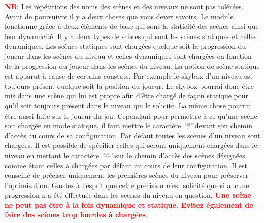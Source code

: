\documentclass[a4paper, 11pt]{article}
\begin{document}
	\textcolor{red}{\textbf{NB}:} Les répétitions des noms des scènes et des niveaux ne sont pas
	tolérées. Avant de poursuivre il y a deux choses que vous devez savoirs: Le module fonctionne grâce à 
	deux éléments de base qui sont la staticité des scènes ainsi que leur dynamicité. Il y a deux types de 
	scènes qui sont les scènes statiques et celles dynamiques. Les scènes statiques sont chargées quelque 
	soit la progression du joueur dans les scènes du niveau et celles dynamiques sont chargées en fonction 
	de la progression du joueur dans les scènes du niveau. La notion de scène statique est apparut à cause 
	de certains constats. Par exemple le skybox d'un niveau est toujours présent quelque soit la position du 
	joueur. Le skybox pourrai donc être mis dans une scène qui lui est propre afin d'être chargé de façon 
	statique pour qu'il soit toujours présent dans le niveau qui le solicite. La même chose pourrai être 
	aussi faite sur le joueur du jeu. Cependant pour permettre à ce qu'une scène soit chargée en mode 
	statique, il faut mettre le caractère \textit{\textcolor{gray}{"\$"}} devant son chemin d'accès au cours 
	de sa configuration. Par défaut toutes les scènes d'un niveau sont chargées. Il est possible de 
	spécifier celles qui seront uniquement chargées dans le niveau en mettant le caractère 
	\textit{\textcolor{gray}{"@"}} sur le chemin d'accès des scènes désignées comme étant celles à chargées 
	par défaut au cours de leur configuration. Il est conseillé de préciser uniquement les premières scènes 
	du niveau pour préserver l'optimisation. Gardez à l'esprit que cette précision n'est solicité que si 
	aucune progression n'a été éffectuée dans les scènes du niveau en question. \textbf{\textcolor{red}{Une 
	scène ne peut pas être à la fois dynamique et statique. Evitez également de faire des scènes trop 
	lourdes à chargées}}.

\end{document}

